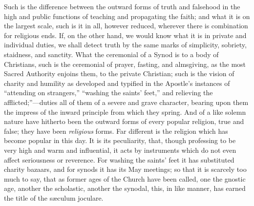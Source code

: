 Such is the
difference between the outward forms of truth and falsehood in the high
and public functions of teaching and propagating the faith; and what it
is on the largest scale, such is it in all, however reduced, wherever
there is combination for religious ends. If,
on the other hand, we would know what it is in private and individual
duties, we shall detect truth by the same marks of simplicity, sobriety,
staidness, and sanctity. What the ceremonial of a Synod is to a body of
Christians, such is the ceremonial of prayer, fasting, and almsgiving,
as the most Sacred Authority enjoins them, to the private Christian;
such is the vision of charity and humility as developed and typified in
the Apostle's instances of ``attending on strangers,'' ``washing
the saints' feet,'' and relieving the afflicted;''—duties all of
them of a severe and grave character, bearing upon them the impress of
the inward principle from which they spring. And of a like solemn nature
have hitherto been the outward forms of every popular religion, true and
false; they have been \emph{religious} forms. Far different is the
religion which has become popular in this day. It is its peculiarity,
that, though professing to be very high and warm and influential, it
acts by instruments which do not even affect seriousness or reverence.
For washing the saints' feet it has substituted charity bazaars, and
for synods it has its May meetings; so that it is scarcely too much to
say, that as former ages of the Church have been called, one the gnostic
age, another the scholastic, another the synodal, this, in like manner,
has earned the title of the sæculum joculare.

